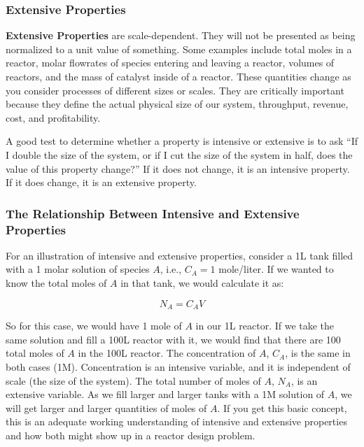 \documentclass[11pt]{article}
\begin{document}
\hypertarget{extensive-properties}{%
\subsubsection{Extensive Properties}\label{extensive-properties}}

\textbf{Extensive Properties} are scale-dependent. They will not be
presented as being normalized to a unit value of something. Some
examples include total moles in a reactor, molar flowrates of species
entering and leaving a reactor, volumes of reactors, and the mass of
catalyst inside of a reactor. These quantities change as you consider
processes of different sizes or scales. They are critically important
because they define the actual physical size of our system, throughput,
revenue, cost, and profitability.

A good test to determine whether a property is intensive or extensive is
to ask ``If I double the size of the system, or if I cut the size of the
system in half, does the value of this property change?'' If it does not
change, it is an intensive property. If it does change, it is an
extensive property.

\hypertarget{the-relationship-between-intensive-and-extensive-properties}{%
\subsubsection{The Relationship Between Intensive and Extensive
Properties}\label{the-relationship-between-intensive-and-extensive-properties}}

For an illustration of intensive and extensive properties, consider a 1L
tank filled with a 1 molar solution of species \(A\), i.e., \(C_A = 1\)
mole/liter. If we wanted to know the total moles of \(A\) in that tank,
we would calculate it as:

\[N_A = C_AV\]

So for this case, we would have 1 mole of \(A\) in our 1L reactor. If we
take the same solution and fill a 100L reactor with it, we would find
that there are 100 total moles of \(A\) in the 100L reactor. The
concentration of \(A\), \(C_A\), is the same in both cases (1M).
Concentration is an intensive variable, and it is independent of scale
(the size of the system). The total number of moles of \(A\), \(N_A\),
is an extensive variable. As we fill larger and larger tanks with a 1M
solution of \(A\), we will get larger and larger quantities of moles of
\(A\). If you get this basic concept, this is an adequate working
understanding of intensive and extensive properties and how both might
show up in a reactor design problem.
\end{document}
